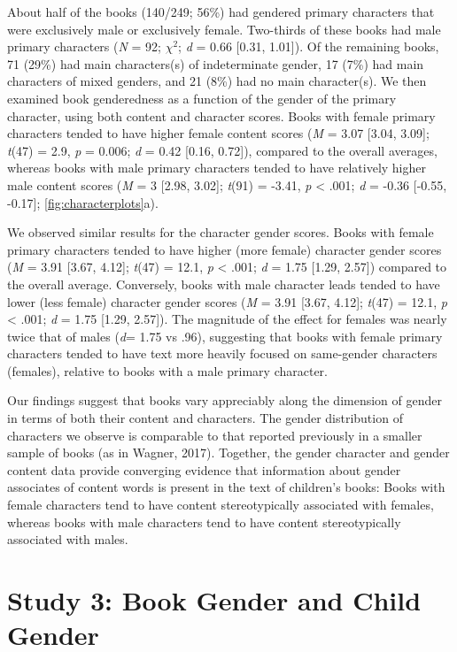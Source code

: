 \documentclass[english,,man,floatsintext]{apa6}
\begin{document}
About half of the books (140/249; 56\%) had gendered primary characters that were exclusively male or exclusively female. Two-thirds of these books had male primary characters (\emph{N} = 92; \(\chi^2\); \emph{d} = 0.66 {[}0.31, 1.01{]}). Of the remaining books, 71 (29\%) had main characters(s) of indeterminate gender, 17 (7\%) had main characters of mixed genders, and 21 (8\%) had no main character(s). We then examined book genderedness as a function of the gender of the primary character, using both content and character scores. Books with female primary characters tended to have higher female content scores (\emph{M} = 3.07 {[}3.04, 3.09{]}; \emph{t}(47) = 2.9, \emph{p} = 0.006; \emph{d} = 0.42 {[}0.16, 0.72{]}), compared to the overall averages, whereas books with male primary characters tended to have relatively higher male content scores (\emph{M} = 3 {[}2.98, 3.02{]}; \emph{t}(91) = -3.41, \emph{p} \textless{} .001; \emph{d} = -0.36 {[}-0.55, -0.17{]}; \autoref{fig:characterplots}a).

We observed similar results for the character gender scores. Books with female primary characters tended to have higher (more female) character gender scores (\emph{M} = 3.91 {[}3.67, 4.12{]}; \emph{t}(47) = 12.1, \emph{p} \textless{} .001; \emph{d} = 1.75 {[}1.29, 2.57{]}) compared to the overall average. Conversely, books with male character leads tended to have lower (less female) character gender scores (\emph{M} = 3.91 {[}3.67, 4.12{]}; \emph{t}(47) = 12.1, \emph{p} \textless{} .001; \emph{d} = 1.75 {[}1.29, 2.57{]}). The magnitude of the effect for females was nearly twice that of males (\emph{d}= 1.75 vs .96), suggesting that books with female primary characters tended to have text more heavily focused on same-gender characters (females), relative to books with a male primary character.

Our findings suggest that books vary appreciably along the dimension of gender in terms of both their content and characters. The gender distribution of characters we observe is comparable to that reported previously in a smaller sample of books (as in Wagner, 2017). Together, the gender character and gender content data provide converging evidence that information about gender associates of content words is present in the text of children's books: Books with female characters tend to have content stereotypically associated with females, whereas books with male characters tend to have content stereotypically associated with males.

\hypertarget{study-3-book-gender-and-child-gender}{%
\section{Study 3: Book Gender and Child Gender}\label{study-3-book-gender-and-child-gender}}
\end{document}

